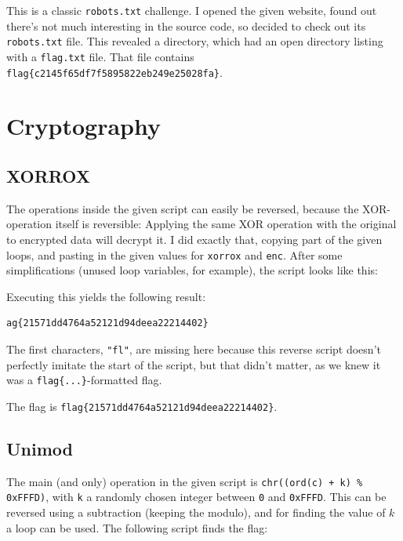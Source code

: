 \documentclass{article}
\begin{document}
This is a classic \texttt{robots.txt} challenge. I opened the given website, found out there's not much interesting in the source code, so decided to check out its \texttt{robots.txt} file. This revealed a directory, which had an open directory listing with a \texttt{flag.txt} file. That file contains \texttt{flag\{c2145f65df7f5895822eb249e25028fa\}}.

\section{Cryptography}

\subsection{XORROX}

The operations inside the given script can easily be reversed, because the XOR-operation itself is reversible: Applying the same XOR operation with the original to encrypted data will decrypt it.  I did exactly that, copying part of the given loops, and pasting in the given values for \texttt{xorrox} and \texttt{enc}. After some simplifications (unused loop variables, for example), the script looks like this:



\noindent Executing this yields the following result:

\begin{Verbatim}[frame=single]
ag{21571dd4764a52121d94deea22214402}
\end{Verbatim}

\noindent The first characters, \texttt{"fl"}, are missing here because this reverse script doesn't perfectly imitate the start of the script, but that didn't matter, as we knew it was a \texttt{flag\{...\}}-formatted flag. \newline


\noindent
The flag is \texttt{flag\{21571dd4764a52121d94deea22214402\}}.

\subsection{Unimod}

The main (and only) operation in the given script is \texttt{chr((ord(c) + k) \% 0xFFFD)}, with \texttt{k} a randomly chosen integer between \texttt{0} and \texttt{0xFFFD}. This can be reversed using a subtraction (keeping the modulo), and for finding the value of $k$ a loop can be used. The following script finds the flag:
\end{document}

